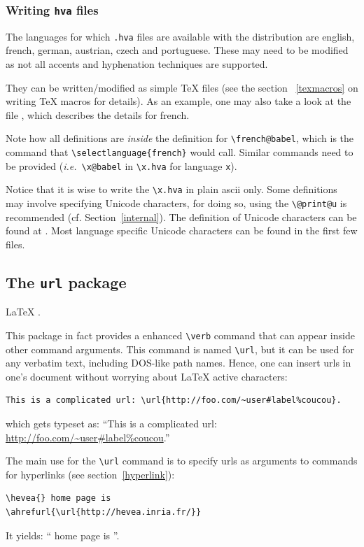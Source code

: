 \subsubsection{Writing \texttt{hva} files}

The languages for which {\tt .hva} files are available with the
distribution are english, french, german, austrian, czech and portuguese. These
may need to be modified as not all accents and hyphenation techniques
are supported.

They can be written/modified as simple \TeX{} files (see the section ~\ref{texmacros} on writing \TeX{} macros for details). As an example, one may also take a look at the file , which describes the details for french. 

Note how all definitions are \emph{inside} the definition for
\verb+\french@babel+, which is the command that
\verb+\selectlanguage{french}+ would call. Similar commands need to be
provided (\emph{i.e.}\ \verb+\x@babel+ in \verb+\x.hva+ for language
\verb+x+).

Notice that it is wise to write the \verb+\x.hva+ in plain ascii only.
Some definitions may involve specifying Unicode characters, for doing
so, using the \verb+\@print@u+ is recommended (cf. Section~\ref{internal}).
The definition of Unicode characters can be found at
.
Most language specific Unicode characters can be found in the first
few files.

\subsection{The \label{urlpackage}\texttt{url} package}
%
\LaTeX{} .

This package in fact provides a enhanced  \verb+\verb+ command that
can appear inside other command arguments.
This command is named \verb+\url+,
but it can be used for any verbatim text, including DOS-like path
names.
Hence, one can insert urls in one's document without worrying about
\LaTeX{} active characters:
\begin{verbatim}
This is a complicated url: \url{http://foo.com/~user#label%coucou}.
\end{verbatim}
which gets typeset as: ``This is a complicated url: \url{http://foo.com/~user#label%coucou}.''

The main use for the \verb+\url+ command is to specify urls as arguments to
\hevea{} commands for hyperlinks (see section~\ref{hyperlink}):
\begin{verbatim}
\hevea{} home page is
\ahrefurl{\url{http://hevea.inria.fr/}}
\end{verbatim}
It yields: ``\hevea{} home page is
''.


